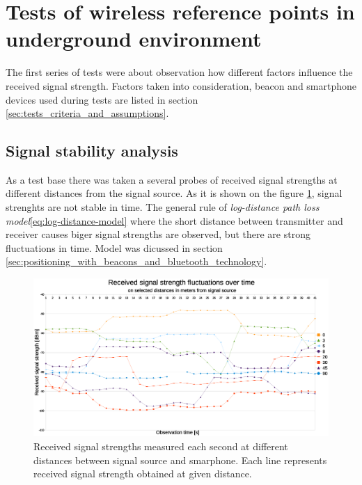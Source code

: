 \documentclass[../main.tex]{subfiles}
\begin{document}
\FloatBarrier


\section{Tests of wireless reference points in underground environment} %
\label{sec:tests_of_system_and_basic_algorithm}

The first series of tests were about observation how different factors influence the received signal strength. Factors taken into consideration, beacon and smartphone devices used during tests are listed in section \ref{sec:tests_criteria_and_assumptions}.

\subsection{Signal stability analysis} %
\label{sub:signal_stability_analysis}

As a test base there was taken a several probes of received signal strengths at different distances from the signal source. As it is shown on the figure \ref{fig:tests_case1_fluctuations_over_time}, signal strenghts are not stable in time. The general rule of \textit{log-distance path loss model}\ref{eq:log-distance-model} where the short distance between transmitter and receiver causes biger signal strengths are observed, but there are strong fluctuations in time. Model was dicussed in section \ref{sec:positioning_with_beacons_and_bluetooth_technology}.

\begin{figure}[ht]
\includegraphics[width=\textwidth, keepaspectratio]{pictures/tests_case1_fluctuations_over_time}
\centering
\caption{Received signal strengths measured each second at different distances between signal source and smarphone. Each line represents received signal strength obtained at given distance.}
\label{fig:tests_case1_fluctuations_over_time}
\end{figure}
\end{document}

